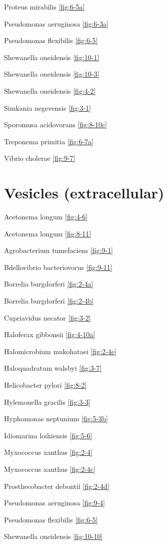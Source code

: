 \documentclass[]{tufte-book}
\begin{document}
Proteus mirabilis \ref{fig:6-5a}

Pseudomonas aeruginosa \ref{fig:6-3a}

Pseudomonas flexibilis \ref{fig:6-5}

Shewanella oneidensis \ref{fig:10-1}

Shewanella oneidensis \ref{fig:10-3}

Shewanella oneidensis \ref{fig:4-2}

Simkania negevensis \ref{fig:3-1}

Sporomusa acidovorans \ref{fig:8-10c}

Treponema primitia \ref{fig:6-7a}

Vibrio cholerae \ref{fig:9-7}

\section*{Vesicles (extracellular)}\label{vesicles-extracellular}

Acetonema longum \ref{fig:4-6}

Acetonema longum \ref{fig:8-11}

Agrobacterium tumefaciens \ref{fig:9-1}

Bdellovibrio bacteriovorus \ref{fig:9-11}

Borrelia burgdorferi \ref{fig:2-4a}

Borrelia burgdorferi \ref{fig:2-4b}

Cupriavidus necator \ref{fig:3-2}

Haloferax gibbonsii \ref{fig:4-10a}

Halomicrobium mukohataei \ref{fig:2-4e}

Haloquadratum walsbyi \ref{fig:3-7}

Helicobacter pylori \ref{fig:8-2}

Hylemonella gracilis \ref{fig:3-3}

Hyphomonas neptunium \ref{fig:5-3b}

Idiomarina loihiensis \ref{fig:5-6}

Myxococcus xanthus \ref{fig:2-4}

Myxococcus xanthus \ref{fig:2-4c}

Prosthecobacter debontii \ref{fig:2-4d}

Pseudomonas aeruginosa \ref{fig:9-4}

Pseudomonas flexibilis \ref{fig:6-5}

Shewanella oneidensis \ref{fig:10-10}
\end{document}
